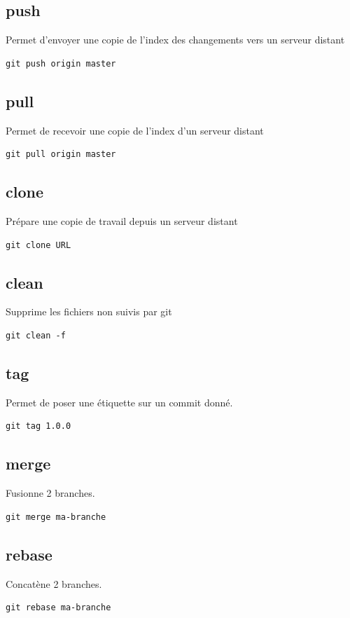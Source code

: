\documentclass[a4paper]{article}
\begin{document}
\subsection*{push}
Permet d'envoyer une copie de l'index des changements vers un serveur distant
\begin{verbatim}
git push origin master
\end{verbatim}

\subsection*{pull}
Permet de recevoir une copie de l'index d'un serveur distant
\begin{verbatim}
git pull origin master
\end{verbatim}

\subsection*{clone}
Prépare une copie de travail depuis un serveur distant
\begin{verbatim}
git clone URL
\end{verbatim}

\subsection*{clean}
Supprime les fichiers non suivis par git
\begin{verbatim}
git clean -f
\end{verbatim}

\subsection*{tag}
Permet de poser une étiquette sur un commit donné.
\begin{verbatim}
git tag 1.0.0
\end{verbatim}

\subsection*{merge}
Fusionne 2 branches.
\begin{verbatim}
git merge ma-branche
\end{verbatim}

\subsection*{rebase}
Concatène 2 branches.
\begin{verbatim}
git rebase ma-branche
\end{verbatim}
\end{document}
